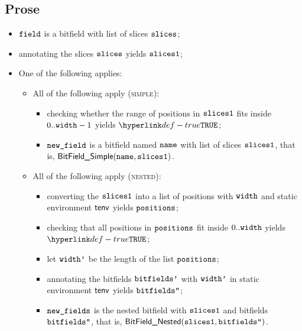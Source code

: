 \documentclass{book}
\newcommand\ProseOrTypeError[0]{\ProseTerminateAs{\TypeErrorConfig}}
\begin{document}
\subsection{Prose}
\begin{itemize}
  \item $\texttt{field}$ is a bitfield with list of slices $\texttt{slices}$;
  \item annotating the slices $\texttt{slices}$ yields $\texttt{slices1}$\ProseOrTypeError;
  \item One of the following applies:
  \begin{itemize}
    \item All of the following apply (\textsc{simple}):
    \begin{itemize}
      \item checking whether the range of positions in $\texttt{slices1}$ fits inside $0..\texttt{width}-1$ yields $\True$\ProseOrTypeError;
      \item $\texttt{new\_field}$ is a bitfield named $\texttt{name}$ with list of slices $\texttt{slices1}$, that is, $\textsf{BitField\_Simple}(\texttt{name}, \texttt{slices1})$.
    \end{itemize}

    \item All of the following apply (\textsc{nested}):
    \begin{itemize}
      \item converting the $\texttt{slices1}$ into a list of positions with $\texttt{width}$ and static environment $\textsf{tenv}$
      yields $\texttt{positions}$\ProseOrTypeError;
      \item checking that all positions in $\texttt{positions}$ fit inside $0..\texttt{width}$ yields \\
            $\True$\ProseOrTypeError;
      \item let $\texttt{width'}$ be the length of the list $\texttt{positions}$;
      \item annotating the bitfields $\texttt{bitfields'}$ with $\texttt{width'}$ in static environment $\textsf{tenv}$ yields $\texttt{bitfields''}$\ProseOrTypeError;
      \item $\texttt{new\_fields}$ is the nested bitfield with $\texttt{slices1}$ and bitfields $\texttt{bitfields''}$, that is, $\textsf{BitField\_Nested}(\texttt{slices1}, \texttt{bitfields''})$.
    \end{itemize}


\end{itemize}
\end{itemize}
\end{document}
